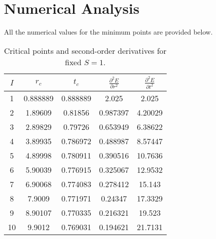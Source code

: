\documentclass[a4paper]{article}
\begin{document}
\section{Numerical Analysis}

All the numerical values for the minimum points are provided below.

\begin{table}[h]
    \centering
    \begin{tabular}{ccccc}
        \toprule
        $I$ & $r_c$ & $t_c$ & $\frac{\partial^2 E}{\partial r^2}$ & $\frac{\partial^2 E}{\partial t^2}$ \\
        \midrule
        1  & 0.888889 & 0.888889 & 2.025 & 2.025 \\
        2  & 1.89609  & 0.81856  & 0.987397 & 4.20029 \\
        3  & 2.89829  & 0.79726  & 0.653949 & 6.38622 \\
        4  & 3.89935  & 0.786972 & 0.488987 & 8.57447 \\
        5  & 4.89998  & 0.780911 & 0.390516 & 10.7636 \\
        6  & 5.90039  & 0.776915 & 0.325067 & 12.9532 \\
        7  & 6.90068  & 0.774083 & 0.278412 & 15.143 \\
        8  & 7.9009   & 0.771971 & 0.24347  & 17.3329 \\
        9  & 8.90107  & 0.770335 & 0.216321 & 19.523 \\
        10 & 9.9012   & 0.769031 & 0.194621 & 21.7131 \\
        \bottomrule
    \end{tabular}
    \caption{Critical points and second-order derivatives for fixed $S=1$.}
    \label{table1}
\end{table}
\end{document}
